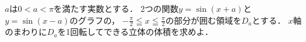 \documentclass[../../main.tex]{subfiles}
\begin{document}
$a$は$0<a<\pi$を満たす実数とする．
2つの関数$y=\sin(x+a)$と$y=\sin(x-a)$のグラフの，
$\displaystyle-\frac{\pi}{2}\leqq x \leqq\frac{\pi}{2}$の部分が囲む領域を$D_a$とする．
$x$軸のまわりに$D_a$を1回転してできる立体の体積を求めよ．
\end{document}
